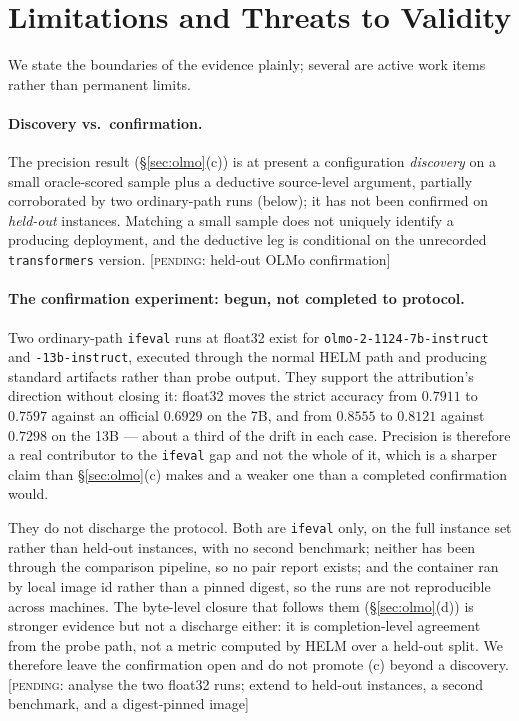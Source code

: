 \section{Limitations and Threats to Validity}
\label{sec:limitations}

We state the boundaries of the evidence plainly; several are active work items
rather than permanent limits.

\paragraph{Discovery vs.\ confirmation.} The precision result
(\S\ref{sec:olmo}(c)) is at present a configuration \emph{discovery} on a small
oracle-scored sample plus a deductive source-level argument, partially corroborated
by two ordinary-path runs (below); it has not been confirmed on \emph{held-out}
instances. Matching a small
sample does not uniquely identify a producing deployment, and the deductive leg is
conditional on the unrecorded \texttt{transformers} version.
{\color{orange}\textsf{\small[\textsc{pending}: held-out OLMo confirmation]}}

\paragraph{The confirmation experiment: begun, not completed to protocol.}
\label{sec:olmo-confirm}
Two ordinary-path \texttt{ifeval} runs at float32 exist for
\texttt{olmo-2-1124-7b-instruct} and \texttt{-13b-instruct}, executed through the
normal HELM path and producing standard artifacts rather than probe output. They
support the attribution's direction without closing it: float32 moves the strict
accuracy from $0.7911$ to $0.7597$ against an official $0.6929$ on the 7B, and
from $0.8555$ to $0.8121$ against $0.7298$ on the 13B --- about a third of the
drift in each case. Precision is therefore a real contributor to the
\texttt{ifeval} gap and not the whole of it, which is a sharper claim than
\S\ref{sec:olmo}(c) makes and a weaker one than a completed confirmation would.

They do not discharge the protocol. Both are \texttt{ifeval} only, on the full
instance set rather than held-out instances, with no second benchmark; neither
has been through the comparison pipeline, so no pair report exists; and the
container ran by local image id rather than a pinned digest, so the runs are not
reproducible across machines. The byte-level closure that follows them
(\S\ref{sec:olmo}(d)) is stronger evidence but not a discharge either: it is
completion-level agreement from the probe path, not a metric computed by HELM over
a held-out split. We therefore leave the confirmation open and do not promote (c)
beyond a discovery.
{\color{orange}\textsf{\small[\textsc{pending}: analyse the two float32 runs; extend to held-out
instances, a second benchmark, and a digest-pinned image]}}

